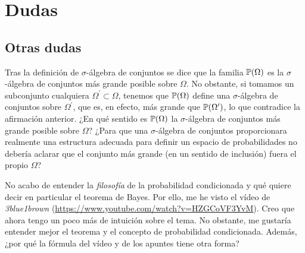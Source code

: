 \chapter{Dudas}


\section{Otras dudas}

\begin{dudas}
  \item Tras la definición de $\sigma$-álgebra de conjuntos se dice que la familia $\mathbb{P}(\Omega)$ es la $\sigma$-álgebra de conjuntos más grande posible sobre $\Omega$. No obstante, si tomamos un subconjunto cualquiera $\Omega^\prime \subset \Omega$, tenemos que $\mathbb{P}(\Omega)$ define una $\sigma$-álgebra de conjuntos sobre $\Omega^\prime$, que es, en efecto, más grande que $\mathbb{P}(\Omega^\prime)$, lo que contradice la afirmación anterior. ¿En qué sentido es $\mathbb{P}(\Omega)$ la $\sigma$-álgebra de conjuntos más grande posible sobre $\Omega$? ¿Para que una $\sigma$-álgebra de conjuntos proporcionara realmente una estructura adecuada para definir un espacio de probabilidades no debería aclarar que el conjunto más grande (en un sentido de inclusión) fuera el propio $\Omega$?
  \item No acabo de entender la \textit{filosofía} de la probabilidad condicionada y qué quiere decir en particular el teorema de Bayes. Por ello, me he visto el vídeo  de \textit{3blue1brown} (\url{https://www.youtube.com/watch?v=HZGCoVF3YvM}). Creo que ahora tengo un poco más de intuición sobre el tema. No obstante, me gustaría entender mejor el teorema y el concepto de probabilidad condicionada. Además, ¿por qué la fórmula del vídeo y de los apuntes tiene otra forma?
\end{dudas}
